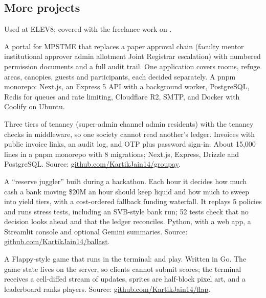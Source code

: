 \subsection{More projects}

Used at ELEV8; covered with the freelance work on .

A portal for MPSTME that replaces a paper approval chain (faculty mentor \arr institutional
approver \arr admin allotment \arr Joint Registrar escalation) with numbered permission documents
and a full audit trail. One application covers rooms, refuge areas, canopies, guests and
participants, each decided separately. A pnpm monorepo: Next.js, an Express 5 API with a background
worker, PostgreSQL, Redis for queues and rate limiting, Cloudflare R2, SMTP, and Docker with Coolify
on Ubuntu.

Three tiers of tenancy (super-admin \arr channel admin \arr residents) with the tenancy checks in
middleware, so one society cannot read another's ledger. Invoices with public invoice links, an
audit log, and OTP plus password sign-in. About 15,000 lines in a pnpm monorepo with 8 migrations;
Next.js, Express, Drizzle and PostgreSQL.
Source: \href{https://github.com/KartikJain14/groupay}{github.com/KartikJain14/groupay}.

A ``reserve juggler'' built during a hackathon. Each hour it decides how much cash a bank moving
\tld\$20M an hour should keep liquid and how much to sweep into yield tiers, with a cost-ordered
fallback funding waterfall. It replays 5 policies and runs stress tests, including an SVB-style
bank run; 52 tests check that no decision looks ahead and that the ledger reconciles. Python, with a
web app, a Streamlit console and optional Gemini summaries.
Source: \href{https://github.com/KartikJain14/ballast}{github.com/KartikJain14/ballast}.

A Flappy-style game that runs in the terminal:  and play. Written in Go. The
game state lives on the server, so clients cannot submit scores; the terminal receives a cell-diffed
stream of updates, sprites are half-block pixel art, and a leaderboard ranks players.
Source: \href{https://github.com/KartikJain14/flap}{github.com/KartikJain14/flap}.

